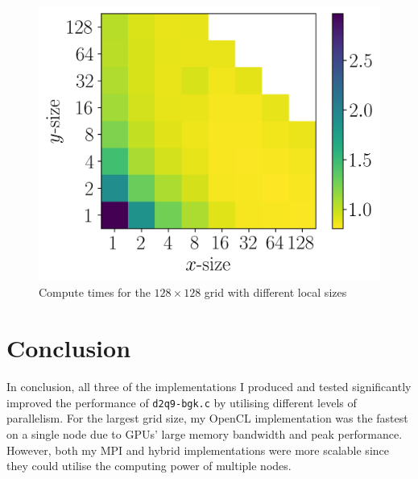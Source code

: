 \documentclass[twocolumn, a4paper]{article}
\begin{document}
\begin{figure}[htbp]
  \centering
  \includegraphics[width=\linewidth]{wg_size.png}
  \caption{Compute times for the $128\times128$ grid with different local sizes}\label{fig:wg_size}
\end{figure}

\section{Conclusion}

In conclusion, all three of the implementations I produced and tested significantly improved the performance of \texttt{d2q9-bgk.c} by utilising different levels of parallelism.
For the largest grid size, my OpenCL implementation was the fastest on a single node due to GPUs' large memory bandwidth and peak performance.
However, both my MPI and hybrid implementations were more scalable since they could utilise the computing power of multiple nodes.

\printbibliography
\end{document}
